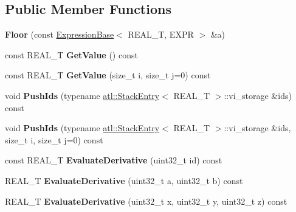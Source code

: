 \subsection*{Public Member Functions}
\begin{DoxyCompactItemize}
\item 
\hypertarget{structatl_1_1_floor_aef10e331b5a8dfd105d4625834805ed5}{{\bfseries Floor} (const \hyperlink{structatl_1_1_expression_base}{Expression\+Base}$<$ R\+E\+A\+L\+\_\+\+T, E\+X\+P\+R $>$ \&a)}\label{structatl_1_1_floor_aef10e331b5a8dfd105d4625834805ed5}

\item 
\hypertarget{structatl_1_1_floor_a0ba9ceb76ef311d1e744fd33ab5e26a0}{const R\+E\+A\+L\+\_\+\+T {\bfseries Get\+Value} () const }\label{structatl_1_1_floor_a0ba9ceb76ef311d1e744fd33ab5e26a0}

\item 
\hypertarget{structatl_1_1_floor_abb51bf2e1df3e1aaa608e2fe1d8f4b6c}{const R\+E\+A\+L\+\_\+\+T {\bfseries Get\+Value} (size\+\_\+t i, size\+\_\+t j=0) const }\label{structatl_1_1_floor_abb51bf2e1df3e1aaa608e2fe1d8f4b6c}

\item 
\hypertarget{structatl_1_1_floor_a00a63079149c6ba771d85003063555a1}{void {\bfseries Push\+Ids} (typename \hyperlink{structatl_1_1_stack_entry}{atl\+::\+Stack\+Entry}$<$ R\+E\+A\+L\+\_\+\+T $>$\+::vi\+\_\+storage \&ids) const }\label{structatl_1_1_floor_a00a63079149c6ba771d85003063555a1}

\item 
\hypertarget{structatl_1_1_floor_a163741875a38d29e0f8bae05690ecee2}{void {\bfseries Push\+Ids} (typename \hyperlink{structatl_1_1_stack_entry}{atl\+::\+Stack\+Entry}$<$ R\+E\+A\+L\+\_\+\+T $>$\+::vi\+\_\+storage \&ids, size\+\_\+t i, size\+\_\+t j=0) const }\label{structatl_1_1_floor_a163741875a38d29e0f8bae05690ecee2}

\item 
\hypertarget{structatl_1_1_floor_a57802c11d13cc65b6b4c5277c166fcec}{const R\+E\+A\+L\+\_\+\+T {\bfseries Evaluate\+Derivative} (uint32\+\_\+t id) const }\label{structatl_1_1_floor_a57802c11d13cc65b6b4c5277c166fcec}

\item 
\hypertarget{structatl_1_1_floor_afd7244e0957f110672b9f796df384cd2}{R\+E\+A\+L\+\_\+\+T {\bfseries Evaluate\+Derivative} (uint32\+\_\+t a, uint32\+\_\+t b) const }\label{structatl_1_1_floor_afd7244e0957f110672b9f796df384cd2}

\item 
\hypertarget{structatl_1_1_floor_a7819c933ee40dfdda197cf0a84815d3f}{R\+E\+A\+L\+\_\+\+T {\bfseries Evaluate\+Derivative} (uint32\+\_\+t x, uint32\+\_\+t y, uint32\+\_\+t z) const }\label{structatl_1_1_floor_a7819c933ee40dfdda197cf0a84815d3f}


\end{DoxyCompactItemize}

